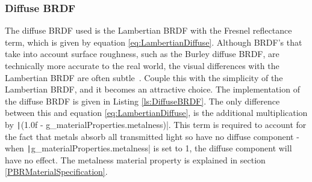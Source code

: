 

\subsubsection{Diffuse BRDF}

The diffuse BRDF used is the Lambertian BRDF with the Fresnel reflectance term, which is given by equation \ref{eq:LambertianDiffuse}. Although BRDF's that take into account surface roughness, such as the Burley diffuse BRDF, are technically more accurate to the real world, the visual differences with the Lambertian BRDF are often subtle~\cite{RealShadingInUnreal}. Couple this with the simplicity of the Lambertian BRDF, and it becomes an attractive choice. The implementation of the diffuse BRDF is given in Listing \ref{ls:DiffuseBRDF}. The only difference between this and equation \ref{eq:LambertianDiffuse}, is the additional multiplication by \texttt|(1.0f - g_materialProperties.metalness)|. This term is required to account for the fact that metals absorb all transmitted light so have no diffuse component - when \texttt|g_materialProperties.metalness| is set to 1, the diffuse component will have no effect. The metalness material property is explained in section \ref{PBRMaterialSpecification}.

